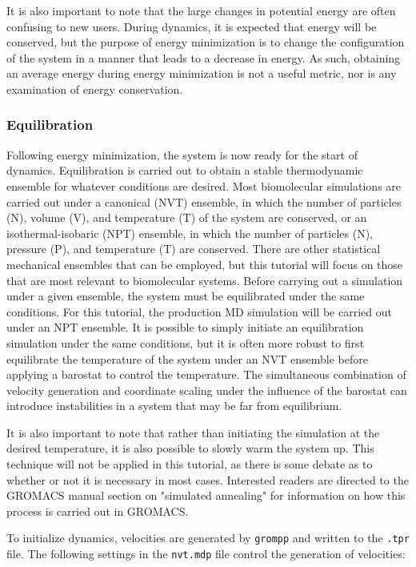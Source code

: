 \documentclass[9pt,tutorial,pubversion]{livecoms}
\begin{document}
It is also important to note that the large changes in potential energy are often confusing to new users. During dynamics, it is expected that energy will be conserved, but the purpose of energy minimization is to change the configuration of the system in a manner that leads to a decrease in energy. As such, obtaining an average energy during energy minimization is not a useful metric, nor is any examination of energy conservation.

\subsubsection{Equilibration} \label{lyso_equil}

Following energy minimization, the system is now ready for the start of dynamics. Equilibration is carried out to obtain a stable thermodynamic ensemble for whatever conditions are desired. Most biomolecular simulations are carried out under a canonical (NVT) ensemble, in which the number of particles (N), volume (V), and temperature (T) of the system are conserved, or an isothermal-isobaric (NPT) ensemble, in which the number of particles (N), pressure (P), and temperature (T) are conserved. There are other statistical mechanical ensembles that can be employed, but this tutorial will focus on those that are most relevant to biomolecular systems. Before carrying out a simulation under a given ensemble, the system must be equilibrated under the same conditions. For this tutorial, the production MD simulation will be carried out under an NPT ensemble. It is possible to simply initiate an equilibration simulation under the same conditions, but it is often more robust to first equilibrate the temperature of the system under an NVT ensemble before applying a barostat to control the temperature. The simultaneous combination of velocity generation and coordinate scaling under the influence of the barostat can introduce instabilities in a system that may be far from equilibrium.

It is also important to note that rather than initiating the simulation at the desired temperature, it is also possible to slowly warm the system up. This technique will not be applied in this tutorial, as there is some debate as to whether or not it is necessary in most cases. Interested readers are directed to the GROMACS manual section on "simulated annealing" for information on how this process is carried out in GROMACS.

To initialize dynamics, velocities are generated by \texttt{grompp} and written to the \texttt{.tpr} file. The following settings in the \texttt{nvt.mdp} file control the generation of velocities:
\end{document}
